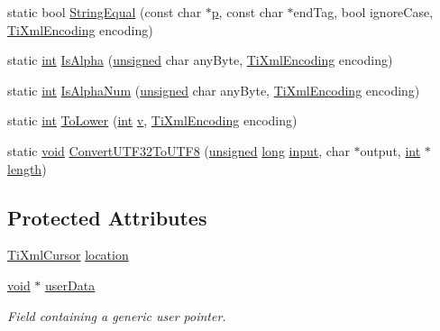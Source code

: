 \begin{DoxyCompactItemize}
\item 
static bool \hyperlink{class_ti_xml_base_ad668006b550c011d05072dd4fc16577d}{String\-Equal} (const char $\ast$\hyperlink{glew_8h_aa5367c14d90f462230c2611b81b41d23}{p}, const char $\ast$end\-Tag, bool ignore\-Case, \hyperlink{tinyxml_8h_a88d51847a13ee0f4b4d320d03d2c4d96}{Ti\-Xml\-Encoding} encoding)
\item 
static \hyperlink{wglew_8h_a500a82aecba06f4550f6849b8099ca21}{int} \hyperlink{class_ti_xml_base_ac95c7391b56770ff134644b1d74a1a4e}{Is\-Alpha} (\hyperlink{_free_image_8h_a425076c7067a1b5166e2cc530e914814}{unsigned} char any\-Byte, \hyperlink{tinyxml_8h_a88d51847a13ee0f4b4d320d03d2c4d96}{Ti\-Xml\-Encoding} encoding)
\item 
static \hyperlink{wglew_8h_a500a82aecba06f4550f6849b8099ca21}{int} \hyperlink{class_ti_xml_base_ae85b1b5e0351c80f2d795ca7005e79b7}{Is\-Alpha\-Num} (\hyperlink{_free_image_8h_a425076c7067a1b5166e2cc530e914814}{unsigned} char any\-Byte, \hyperlink{tinyxml_8h_a88d51847a13ee0f4b4d320d03d2c4d96}{Ti\-Xml\-Encoding} encoding)
\item 
static \hyperlink{wglew_8h_a500a82aecba06f4550f6849b8099ca21}{int} \hyperlink{class_ti_xml_base_a799f17405a86a5c2029618e85f11a097}{To\-Lower} (\hyperlink{wglew_8h_a500a82aecba06f4550f6849b8099ca21}{int} \hyperlink{glew_8h_a6509431814422c215a65946289dd98b8}{v}, \hyperlink{tinyxml_8h_a88d51847a13ee0f4b4d320d03d2c4d96}{Ti\-Xml\-Encoding} encoding)
\item 
static \hyperlink{wglew_8h_aeea6e3dfae3acf232096f57d2d57f084}{void} \hyperlink{class_ti_xml_base_ad2b292fa401b8a5b8e6536de9261a3bb}{Convert\-U\-T\-F32\-To\-U\-T\-F8} (\hyperlink{_free_image_8h_a425076c7067a1b5166e2cc530e914814}{unsigned} \hyperlink{_free_image_8h_a7701bb16365a51acda9234120673781d}{long} \hyperlink{glew_8h_ad3c78daa7d8673f71649d4840c641779}{input}, char $\ast$output, \hyperlink{wglew_8h_a500a82aecba06f4550f6849b8099ca21}{int} $\ast$\hyperlink{fmod__codec_8h_a921fa83f7755f0139c84ba1831417a2e}{length})
\end{DoxyCompactItemize}
\subsection*{Protected Attributes}
\begin{DoxyCompactItemize}
\item 
\hyperlink{struct_ti_xml_cursor}{Ti\-Xml\-Cursor} \hyperlink{class_ti_xml_base_a0d992580f3bc264909f898e942677a3c}{location}
\item 
\hyperlink{wglew_8h_aeea6e3dfae3acf232096f57d2d57f084}{void} $\ast$ \hyperlink{class_ti_xml_base_ab242c01590191f644569fa89a080d97c}{user\-Data}
\begin{DoxyCompactList}\small\item\em Field containing a generic user pointer. \end{DoxyCompactList}\end{DoxyCompactItemize}
